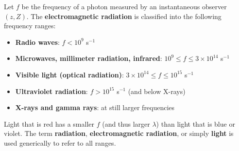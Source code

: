 Let $f$ be the frequency of a photon measured by an instantaneous observer $(z, Z)$. The \textbf{electromagnetic radiation} is classified into the following frequency ranges:

\begin{itemize}
\item \textbf{Radio waves}: $f < 10^9$ s$^{-1}$
\item \textbf{Microwaves, millimeter radiation, infrared}: $10^9 \leq f \leq 3 \times 10^{14}$ s$^{-1}$
\item \textbf{Visible light (optical radiation)}: $3 \times 10^{14} \leq f \leq 10^{15}$ s$^{-1}$
\item \textbf{Ultraviolet radiation}: $f > 10^{15}$ s$^{-1}$ (and below X-rays)
\item \textbf{X-rays and gamma rays}: at still larger frequencies
\end{itemize}

Light that is red has a smaller $f$ (and thus larger $\lambda$) than light that is blue or violet. The term \textbf{radiation}, \textbf{electromagnetic radiation}, or simply \textbf{light} is used generically to refer to all ranges.
